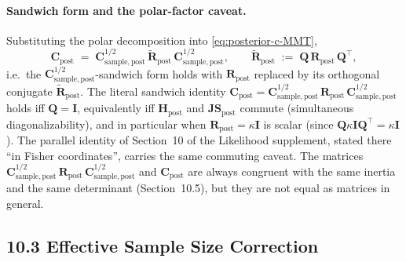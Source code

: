\documentclass[11pt]{article}
\begin{document}
\paragraph{Sandwich form and the polar-factor caveat.}
Substituting the polar decomposition into \eqref{eq:posterior-c-MMT},
\begin{equation}
\mathbf C_{\mathrm{post}}
\;=\;
\mathbf C_{\mathrm{sample},\mathrm{post}}^{1/2}\,
\widetilde{\mathbf R}_{\mathrm{post}}\,
\mathbf C_{\mathrm{sample},\mathrm{post}}^{1/2},
\qquad
\widetilde{\mathbf R}_{\mathrm{post}}
\;:=\;
\mathbf Q\,\mathbf R_{\mathrm{post}}\,\mathbf Q^\top,
\label{eq:posterior-c-sandwich}
\end{equation}
i.e.\ the $\mathbf C_{\mathrm{sample},\mathrm{post}}^{1/2}$-sandwich form holds with $\mathbf R_{\mathrm{post}}$ replaced by its orthogonal conjugate $\widetilde{\mathbf R}_{\mathrm{post}}$. The literal sandwich identity $\mathbf C_{\mathrm{post}} = \mathbf C_{\mathrm{sample},\mathrm{post}}^{1/2}\, \mathbf R_{\mathrm{post}}\, \mathbf C_{\mathrm{sample},\mathrm{post}}^{1/2}$ holds iff $\mathbf Q = \mathbf I$, equivalently iff $\mathbf H_{\mathrm{post}}$ and $\mathbf{JS}_{\mathrm{post}}$ commute (simultaneous diagonalizability), and in particular when $\mathbf R_{\mathrm{post}} = \kappa \mathbf I$ is scalar (since $\mathbf Q \kappa \mathbf I \mathbf Q^\top = \kappa \mathbf I$). The parallel identity of Section~10 of the Likelihood supplement, stated there ``in Fisher coordinates'', carries the same commuting caveat. The matrices $\mathbf C_{\mathrm{sample},\mathrm{post}}^{1/2}\, \mathbf R_{\mathrm{post}}\, \mathbf C_{\mathrm{sample},\mathrm{post}}^{1/2}$ and $\mathbf C_{\mathrm{post}}$ are always congruent with the same inertia and the same determinant (Section~10.5), but they are not equal as matrices in general.

\subsection*{10.3 Effective Sample Size Correction}
\end{document}
